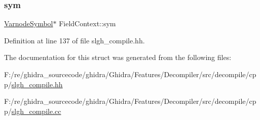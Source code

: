 \subsubsection{\texorpdfstring{sym}{sym}}
{\footnotesize\ttfamily \mbox{\hyperlink{class_varnode_symbol}{Varnode\+Symbol}}$\ast$ Field\+Context\+::sym}



Definition at line 137 of file slgh\+\_\+compile.\+hh.



The documentation for this struct was generated from the following files\+:\begin{DoxyCompactItemize}
\item 
F\+:/re/ghidra\+\_\+sourcecode/ghidra/\+Ghidra/\+Features/\+Decompiler/src/decompile/cpp/\mbox{\hyperlink{slgh__compile_8hh}{slgh\+\_\+compile.\+hh}}\item 
F\+:/re/ghidra\+\_\+sourcecode/ghidra/\+Ghidra/\+Features/\+Decompiler/src/decompile/cpp/\mbox{\hyperlink{slgh__compile_8cc}{slgh\+\_\+compile.\+cc}}\end{DoxyCompactItemize}
